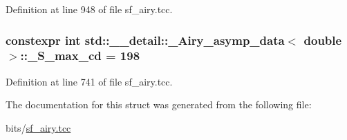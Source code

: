 Definition at line 948 of file sf\+\_\+airy.\+tcc.

\subsubsection[{\texorpdfstring{\+\_\+\+S\+\_\+max\+\_\+cd}{_S_max_cd}}]{\setlength{\rightskip}{0pt plus 5cm}constexpr int {\bf std\+::\+\_\+\+\_\+detail\+::\+\_\+\+Airy\+\_\+asymp\+\_\+data}$<$ double $>$\+::\+\_\+\+S\+\_\+max\+\_\+cd = 198\hspace{0.3cm}{\ttfamily [static]}}\hypertarget{structstd_1_1____detail_1_1__Airy__asymp__data_3_01double_01_4_a38e485184d2762e83a27937efc343d01}{}\label{structstd_1_1____detail_1_1__Airy__asymp__data_3_01double_01_4_a38e485184d2762e83a27937efc343d01}


Definition at line 741 of file sf\+\_\+airy.\+tcc.



The documentation for this struct was generated from the following file\+:\begin{DoxyCompactItemize}
\item 
bits/\hyperlink{sf__airy_8tcc}{sf\+\_\+airy.\+tcc}\end{DoxyCompactItemize}

